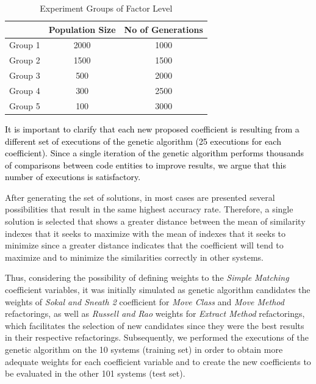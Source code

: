 \documentclass[smallextended,natbib]{svjour3}
\begin{document}
{\setlength{\tabcolsep}{10pt}
\begin{table}[H]
\vspace{-3pt}
\centering
\caption{Experiment Groups of Factor Level}
\vspace{-8pt}
\label{tab:conftuk}
\begin{tabular}{lcc}
\hline %
\rowcolor{gray!50} \textbf{} & \textbf{Population Size} & \textbf{No of Generations} \\ 
\hline %
\rowcolor{white}Group 1 & 2000 & 1000  \\ %
\rowcolor{gray!15}Group 2 & 1500 & 1500 \\ %
\rowcolor{white}Group 3 & 500 & 2000 \\ 
\rowcolor{gray!15}Group 4 & 300 & 2500  \\
\rowcolor{white}Group 5 & 100 & 3000 \\ 
\hline %
\end{tabular}
\vspace{-6pt}
\end{table}

\textcolor{black}{It is important to clarify that each new proposed coefficient is resulting from a different set of executions of the genetic algorithm (25 executions for each coefficient). Since a single iteration of the genetic algorithm performs thousands of comparisons between code entities to improve results, we argue that this number of executions is satisfactory.}

After generating the set of solutions, in most cases are presented several possibilities that result in the same highest accuracy rate. Therefore, a single solution is selected that shows a greater distance between the mean of similarity indexes that it seeks to maximize with the mean of indexes that it seeks to minimize since a greater distance indicates that the coefficient will tend to maximize and to minimize the similarities correctly in other systems.

Thus, considering the possibility of defining weights to the \textit{Simple Matching} coefficient variables, it was initially simulated as genetic algorithm candidates the weights of \textit{Sokal and Sneath 2} coefficient for \textit{Move Class} and \textit{Move Method} refactorings, as well as \textit{Russell and Rao} weights for \textit{Extract Method} refactorings, which facilitates the selection of new candidates since they were the best results in their respective refactorings. Subsequently, we performed the executions of the genetic algorithm on the 10 systems (training set) in order to obtain more adequate weights for each coefficient variable and to create the new coefficients to be evaluated in the other 101 systems (test set).

}
\end{document}
